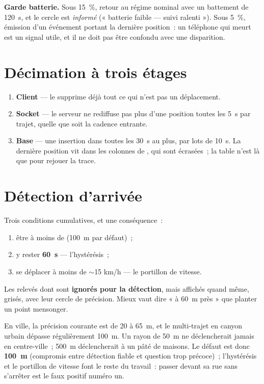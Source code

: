 \textbf{Garde batterie.} Sous 15~\%, retour au régime nominal avec un battement de 120~s, et
le cercle est \emph{informé} (« batterie faible --- suivi ralenti »). Sous 5~\%, émission
d'un événement portant la dernière position~: un téléphone qui meurt est un signal utile, et
il ne doit pas être confondu avec une disparition.

\section{Décimation à trois étages}

\begin{enumerate}[leftmargin=1.6em]
  \item \textbf{Client} --- le  supprime déjà tout ce qui n'est pas un
        déplacement.
  \item \textbf{Socket} --- le serveur ne rediffuse pas plus d'une position toutes les 5~s
        par trajet, quelle que soit la cadence entrante.
  \item \textbf{Base} --- une insertion dans  toutes les 30~s au plus, par
        lots de 10~s. La dernière position vit dans les colonnes  de
        , qui sont écrasées~; la table  n'est là que pour
        rejouer la trace.
\end{enumerate}

\section{Détection d'arrivée}

Trois conditions cumulatives, et une conséquence~:

\begin{enumerate}[leftmargin=1.6em]
  \item être à moins de  (100~m par défaut)~;
  \item y rester \textbf{60~s} --- l'hystérésis~;
  \item se déplacer à moins de $\sim$15 km/h --- le portillon de vitesse.
\end{enumerate}

Les relevés dont  sont \textbf{ignorés pour la détection}, mais affichés
quand même, grisés, avec leur cercle de précision. Mieux vaut dire « à 60~m près » que
planter un point mensonger.

\begin{note}
En ville, la précision courante est de 20 à 65~m, et le multi-trajet en canyon urbain
dépasse régulièrement 100~m. Un rayon de 50~m ne déclencherait jamais en centre-ville~; 500~m
déclencherait à un pâté de maisons. Le défaut est donc \textbf{100~m} (compromis entre
détection fiable et question trop précoce)~; l'hystérésis et le portillon de vitesse font le
reste du travail~: passer devant sa rue sans s'arrêter est le faux positif numéro un.
\end{note}

